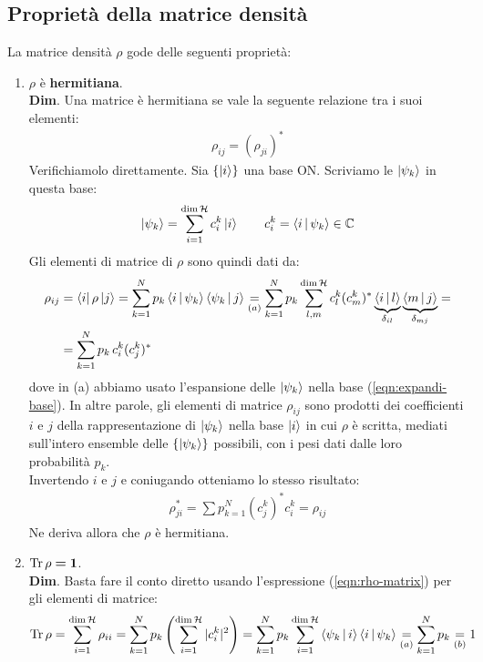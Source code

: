 \documentclass[../../InformazioneQuantistica.tex]{subfiles}
\begin{document}
\subsection{Proprietà della matrice densità}
La matrice densità $\rho$ gode delle seguenti proprietà:
\begin{enumerate}
\item $\rho$ è \textbf{hermitiana}.\\
\textbf{Dim}. 
Una matrice è hermitiana se vale la seguente relazione tra i suoi elementi:
\begin{align*}
    \rho_{ij} = (\rho_{ji})^*
\end{align*}
Verifichiamolo direttamente. Sia $\{\Ket{i}\}$ una base ON. Scriviamo le $\Ket{\psi_k}$ in questa base:
\begin{align}
\Ket{\psi_k} = \sum_{i=1}^{\operatorname{dim}\mathcal{H}} c_i^k \Ket{i} \qquad c_i^k = \Braket{i|\psi_k} \in \mathbb{C}
\label{eqn:expandi-base}
\end{align} 
Gli elementi di matrice di $\rho$ sono quindi dati da:
\begin{align}\nonumber
\rho_{ij} &= \Bra{i}\rho\Ket{j} = \sum_{k=1}^N
p_k \Braket{i|\psi_k}\Braket{\psi_k|j} \underset{(a)}{=} \sum_{k=1}^N p_k \sum_{l,m}^{\operatorname{dim}\mathcal{H}} c^k_l (c_m^k)^* \underbrace{\Braket{i|l}}_{\delta_{il}}\underbrace{\Braket{m|j}}_{\delta_{mj}} =\\
&=\sum_{k=1}^N p_k\, c_i^k (c_j^k)^*
\label{eqn:rho-matrix} 
\end{align}
dove in (a) abbiamo usato l'espansione delle $\Ket{\psi_k}$ nella base (\ref{eqn:expandi-base}). In altre parole, gli elementi di matrice $\rho_{ij}$ sono prodotti dei coefficienti $i$ e $j$ della rappresentazione di $\Ket{\psi_k}$ nella base $\Ket{i}$ in cui $\rho$ è scritta, mediati sull'intero ensemble delle $\{\Ket{\psi_k}\}$ possibili, con i pesi dati dalle loro probabilità $p_k$. \\
Invertendo $i$ e $j$ e coniugando otteniamo lo stesso risultato:
\begin{align*}
\rho_{ji}^* = \sum p_{k=1}^N (c_j^k)^* c_i^k = \rho_{ij}
\end{align*}
Ne deriva allora che $\rho$ è hermitiana.
\item $\operatorname{Tr}\rho \bm{= 1}$.\\
\textbf{Dim}. Basta fare il conto diretto usando l'espressione (\ref{eqn:rho-matrix}) per gli elementi di matrice:
\begin{align*}
\op{Tr}\rho = \sum_{i=1}^{\op{dim}\hs} \rho_{ii} = \sum_{k=1}^N p_k \left(\sum_{i=1}^{\op{dim} \hs} |c_i^k|^2 \right) = \sum_{k=1}^N p_k \sum_{i=1}^{\op{dim}\hs} \braket{\psi_k|i}\braket{i|\psi_k} \underset{(a)}{=} \sum_{k=1}^N p_k \underset{(b)}{=} 1

\end{align*}
\end{enumerate}
\end{document}
